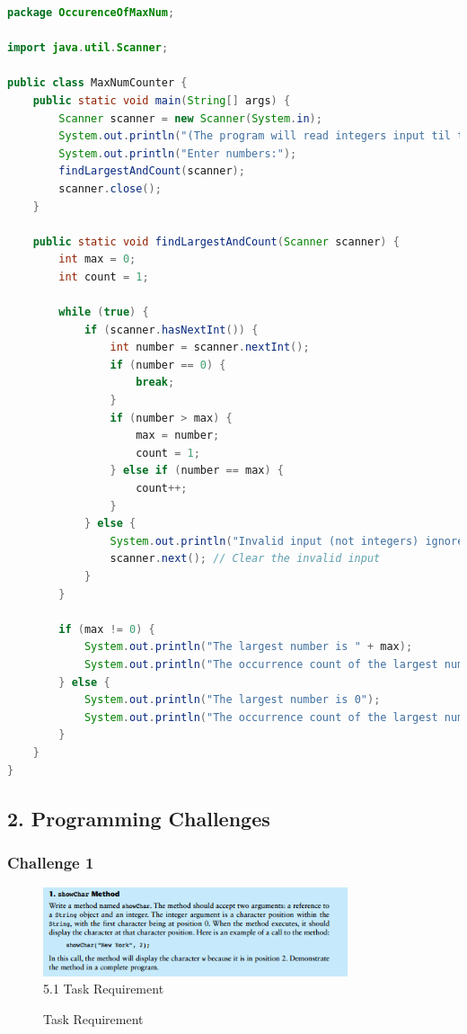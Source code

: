 \documentclass{article}
\begin{document}
\begin{lstlisting}[language=Java, caption=MaxNumCounter.java]
package OccurenceOfMaxNum;

import java.util.Scanner;

public class MaxNumCounter {
    public static void main(String[] args) {
        Scanner scanner = new Scanner(System.in);
        System.out.println("(The program will read integers input til the first 0)");
        System.out.println("Enter numbers:");
        findLargestAndCount(scanner);
        scanner.close();
    }

    public static void findLargestAndCount(Scanner scanner) {
        int max = 0;
        int count = 1;

        while (true) {
            if (scanner.hasNextInt()) {
                int number = scanner.nextInt();
                if (number == 0) {
                    break;
                }
                if (number > max) {
                    max = number;
                    count = 1;
                } else if (number == max) {
                    count++;
                }
            } else {
                System.out.println("Invalid input (not integers) ignored.");
                scanner.next(); // Clear the invalid input
            }
        }

        if (max != 0) {
            System.out.println("The largest number is " + max);
            System.out.println("The occurrence count of the largest number is " + count);
        } else {
            System.out.println("The largest number is 0");
            System.out.println("The occurrence count of the largest number is 1");
        }
    }
}
\end{lstlisting}

\subsection*{2. Programming Challenges}

\subsubsection*{Challenge 1}
\begin{figure}[H]
    \centering
    \includegraphics[width=0.8\textwidth]{./Assets/Task requirements/Assignment5/5.1.png}
    \caption{5.1 Task Requirement}
\end{figure}
\begin{figure}[h]
    \centering
    \caption{Task Requirement}
\end{figure}
\end{document}
